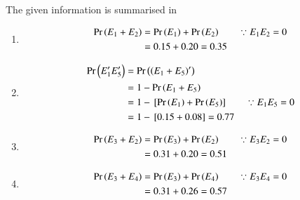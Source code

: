 The given information is summarised in 
\begin{table}[htb]\centering
	
	\caption{}
	\label{tab:exemplar/11/16/3/8/table2}
\end{table}	
%
\begin{enumerate}
\item 
\begin{align} 
	\Pr\left(E_1 + E_2\right) &= \Pr\left(E_1\right) + \Pr\left(E_2\right)   \qquad \because E_1E_2=0\\
	&= 0.15 + 0.20 
	= 0.35
\end{align}
%
\item 
\begin{align} 
	\Pr\left(E_1^{\prime} E_5^{\prime}\right) &=  \Pr\left(\left(E_1 + E_5\right)^{\prime}\right)  \\
	&= 1- \Pr\left(E_1 + E_5\right)\\
	&= 1- {}\left[\Pr\left(E_1\right) + \Pr\left(E_5\right) \right]  \qquad \because E_1E_5=0\\
	&= 1- {}\left[0.15 + 0.08 \right]
	= 0.77\\
\end{align}
%
\item 
\begin{align} 
	\Pr\left(E_3 + E_2\right) &= \Pr\left(E_3\right) + \Pr\left(E_2\right)   \qquad \because E_3E_2=0\\
	&= 0.31 + 0.20 
	= 0.51
\end{align}
\item 
\begin{align} 
	\Pr\left(E_3 + E_4\right) &= \Pr\left(E_3\right) + \Pr\left(E_4\right)   \qquad \because E_3E_4=0\\
	&= 0.31 + 0.26 
	= 0.57\\
\end{align}
\end{enumerate}



